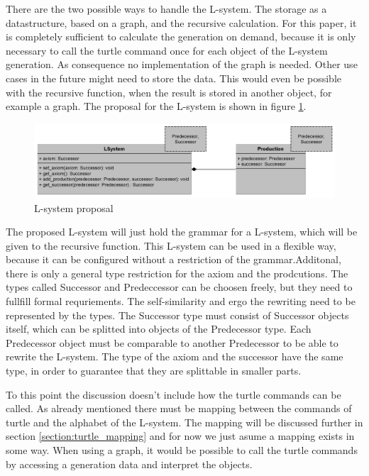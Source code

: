 \documentclass[english]{cpp-hmwk}
\begin{document}
\bigskip
 
\noindent There are the two possible ways to handle the L-system. The storage as a datastructure, based on a graph, and the recursive calculation. For this paper, it is completely sufficient to calculate the generation on demand, because it is only necessary to call the turtle command once for each object of the L-system generation. As consequence no implementation of the graph is needed. Other use cases in the future might need to store the data. This would even be possible with the recursive function, when the result is stored in another object, for example a graph. The proposal for the L-system is shown in figure \ref{figure:lsystem_proposal}.

\begin{figure}[h!]
	\centering
	\includegraphics[width=1\columnwidth]{../graphs/LSystem/examples/l_system_proposal.png}
	\caption{L-system proposal}
	\label{figure:lsystem_proposal}
\end{figure}

\medskip
\noindent The proposed L-system will just hold the grammar for a L-system, which will be given to the recursive function. This L-system can be used in a flexible way, because it can be configured without a restriction of the grammar.Additonal, there is only a general type restriction for the axiom and the prodcutions. The types called Successor and Predeccessor can be choosen freely, but they need to fullfill formal requriements. The self-similarity and ergo the rewriting need to be represented by the types. The Successor type must consist of Successor objects itself, which can be splitted into objects of the Predecessor type. Each Predecessor object must be comparable to another Predecessor to be able to rewrite the L-system. 
 The type of the axiom and the successor have the same type, in order to guarantee that they are splittable in smaller parts.
 
To this point the discussion doesn't include how the turtle commands can be called. As already mentioned there must be mapping between the commands of turtle and the alphabet of the L-system. The mapping will be discussed further in section \ref{section:turtle_mapping} and for now we just asume a mapping exists in some way. When using a graph, it would be possible to call the turtle commands by accessing a generation data and interpret the objects.
\end{document}
